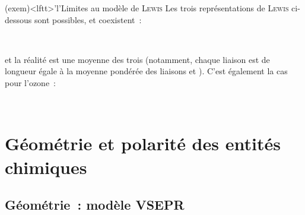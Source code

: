 \documentclass[../../main/main.tex]{subfiles}
\begin{document}
\begin{tcb*}(exem)<lftt>'l'{Limites au modèle de \textsc{Lewis}}
	Les trois représentations de \textsc{Lewis} ci-dessous sont possibles, et
	coexistent~:
	\begin{center}
		\hfill
		\hfill
		\hfill
		\hfill~
	\end{center}
	et la réalité est une moyenne des trois (notamment, chaque liaison est de
	longueur égale à la moyenne pondérée des liaisons  et ).
	C'est également la cas pour l'ozone~:
	\begin{center}
		\hfill
		\hfill
		\hfill~
	\end{center}
\end{tcb*}

\section{Géométrie et polarité des entités chimiques}
\subsection{Géométrie~: modèle VSEPR}
\end{document}
